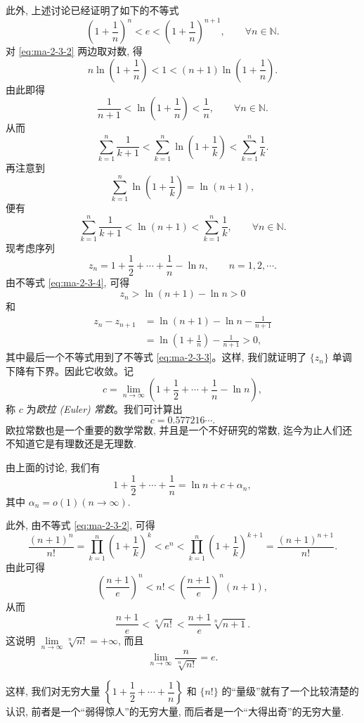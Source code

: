 此外, 上述讨论已经证明了如下的不等式
\begin{equation}
  \left(1+\frac1n\right)^n
  <
  e
  <
  \left(1+\frac1n\right)^{n+1},
  \qquad \forall n\in\mathbb{N}.
  \label{eq:ma-2-3-2}
\end{equation}
对 \eqref{eq:ma-2-3-2} 两边取对数, 得
\[
  n\ln\left(1+\frac1n\right)
  <
  1
  <
  (n+1)\ln\left(1+\frac1n\right).
\]
由此即得
\begin{equation}
  \frac1{n+1}
  <
  \ln\left(1+\frac1n\right)
  <
  \frac1n,\qquad \forall n\in\mathbb{N}.
  \label{eq:ma-2-3-3}
\end{equation}
从而
\[
  \sum_{k=1}^n\frac1{k+1}
  <
  \sum_{k=1}^n\ln\left(1+\frac1k\right)
  <
  \sum_{k=1}^n\frac1k.
\]
再注意到
\[
  \sum_{k=1}^n\ln\left(1+\frac1k\right)=\ln(n+1),
\]
便有
\begin{equation}
  \sum_{k=1}^n\frac1{k+1}
  <
  \ln(n+1)
  <
  \sum_{k=1}^n\frac1k,\qquad \forall n\in\mathbb{N}.
  \label{eq:ma-2-3-4}
\end{equation}
现考虑序列
\[
  z_n=1+\frac12+\cdots+\frac1n-\ln n,\qquad n=1,2,\cdots.
\]
由不等式 \eqref{eq:ma-2-3-4}, 可得
\[
  z_n>\ln(n+1)-\ln n>0
\]
和
\[
\begin{aligned}
  z_n-z_{n+1}
  &=
  \ln(n+1)-\ln n-\frac1{n+1}\\
  &=
  \ln\left(1+\frac1n\right)-\frac1{n+1}>0,
\end{aligned}
\]
其中最后一个不等式用到了不等式 \eqref{eq:ma-2-3-3}。这样, 我们就证明了 $\{z_n\}$ 单调下降有下界。因此它收敛。记
\[
  c=\lim_{n\to\infty}\left(1+\frac12+\cdots+\frac1n-\ln n\right),
\]
称 $c$ 为\emph{欧拉 (Euler) 常数}。我们可计算出
\[
  c=0.577216\cdots.
\]
欧拉常数也是一个重要的数学常数, 并且是一个不好研究的常数, 迄今为止人们还不知道它是有理数还是无理数.

由上面的讨论, 我们有
\[
  1+\frac12+\cdots+\frac1n=\ln n+c+\alpha_n,
\]
其中 $\alpha_n=o(1)(n\to\infty)$.

此外, 由不等式 \eqref{eq:ma-2-3-2}, 可得
\[
  \frac{(n+1)^n}{n!}
  =
  \prod_{k=1}^n\left(1+\frac1k\right)^k
  <
  e^n
  <
  \prod_{k=1}^n\left(1+\frac1k\right)^{k+1}
  =
  \frac{(n+1)^{n+1}}{n!}.
\]
由此可得
\[
  \left(\frac{n+1}{e}\right)^n<n!<\left(\frac{n+1}{e}\right)^n(n+1),
\]
从而
\[
  \frac{n+1}{e}<\sqrt[n]{n!}<\frac{n+1}{e}\sqrt[n]{n+1}.
\]
这说明 $\lim\limits_{n\to\infty}\sqrt[n]{n!}=+\infty$, 而且
\[
  \lim_{n\to\infty}\frac n{\sqrt[n]{n!}}=e.
\]

这样, 我们对无穷大量 $\left\{1+\dfrac12+\cdots+\dfrac1n\right\}$ 和 $\{n!\}$ 的``量级''就有了一个比较清楚的认识, 前者是一个``弱得惊人''的无穷大量, 而后者是一个``大得出奇''的无穷大量.

